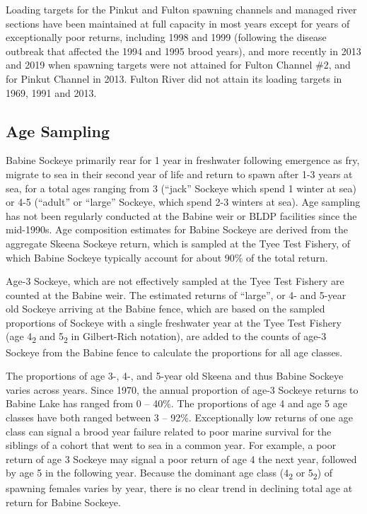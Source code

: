 \documentclass[french,11pt]{book}
\begin{document}
Loading targets for the Pinkut and Fulton spawning channels and managed river sections have been maintained at full capacity in most years except for years of exceptionally poor returns, including 1998 and 1999 (following the disease outbreak that affected the 1994 and 1995 brood years), and more recently in 2013 and 2019 when spawning targets were not attained for Fulton Channel \#2, and for Pinkut Channel in 2013. Fulton River did not attain its loading targets in 1969, 1991 and 2013.

\label{available-biological-information-for-wild-and-enhanced-babine-sockeye}

\subsection{Age Sampling}\label{age-sampling}

Babine Sockeye primarily rear for 1 year in freshwater following emergence as fry, migrate to sea in their second year of life and return to spawn after 1-3 years at sea, for a total ages ranging from 3 (``jack'' Sockeye which spend 1 winter at sea) or 4-5 (``adult'' or ``large'' Sockeye, which spend 2-3 winters at sea). Age sampling has not been regularly conducted at the Babine weir or BLDP facilities since the mid-1990s. Age composition estimates for Babine Sockeye are derived from the aggregate Skeena Sockeye return, which is sampled at the Tyee Test Fishery, of which Babine Sockeye typically account for about 90\% of the total return.

Age-3 Sockeye, which are not effectively sampled at the Tyee Test Fishery are counted at the Babine weir. The estimated returns of ``large'', or 4- and 5-year old Sockeye arriving at the Babine fence, which are based on the sampled proportions of Sockeye with a single freshwater year at the Tyee Test Fishery (age 4\textsubscript{2} and 5\textsubscript{2} in Gilbert-Rich notation), are added to the counts of age-3 Sockeye from the Babine fence to calculate the proportions for all age classes.

The proportions of age 3-, 4-, and 5-year old Skeena and thus Babine Sockeye varies across years. Since 1970, the annual proportion of age-3 Sockeye returns to Babine Lake has ranged from 0 -- 40\%. The proportions of age 4 and age 5 age classes have both ranged between 3 -- 92\%. Exceptionally low returns of one age class can signal a brood year failure related to poor marine survival for the siblings of a cohort that went to sea in a common year. For example, a poor return of age 3 Sockeye may signal a poor return of age 4 the next year, followed by age 5 in the following year. Because the dominant age class (4\textsubscript{2} or 5\textsubscript{2}) of spawning females varies by year, there is no clear trend in declining total age at return for Babine Sockeye.
\end{document}
